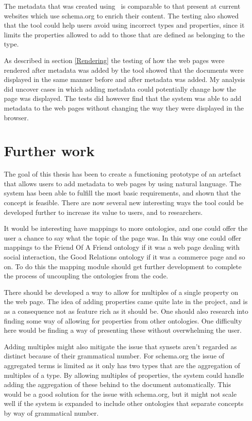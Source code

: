 The metadata that was created using \theartefact\ is comparable to that present at current websites which use schema.org to
enrich their content.
The testing also showed that the tool could help users avoid using incorrect types and properties,
since it limits the properties allowed to add to those that are defined as belonging to the type.

As described in section \ref{Rendering} the testing of how the web pages were rendered after metadata was added by the tool
showed that the documents were displayed in the same manner before and after metadata was added.
My analysis did uncover cases in which adding metadata could potentially change how the page was displayed.
The tests did however find that the system was able to add metadata to the web pages without changing the way they were displayed in the browser.


\section{Further work}
The goal of this thesis has been to create a functioning prototype of an artefact that allows users to add metadata
to web pages by using natural language.
The system has been able to fulfill the most basic requirements, and shown that the concept is feasible.
There are now several new interesting ways the tool could be developed further to increase its value to users,
and to researchers.

It would be interesting have mappings to more ontologies,
and one could offer the user a chance to say what the topic of the page was.
In this way one could offer mappings to the Friend Of A Friend ontology if it was a web page dealing with
social interaction, the Good Relations ontology if it was a commerce page and so on.
To do this the mapping module should get further development to complete the process of uncoupling the ontologies
from the code.

There should be developed a way to allow for multiples of a single property on the web page.
The idea of adding properties came quite late in the project,
and is as a consequence not as feature rich as it should be.
One should also research into finding some way of allowing for properties from other ontologies.
One difficulty here would be finding a way of presenting these without overwhelming the user.

Adding multiples might also mitigate the issue that synsets aren't regarded as distinct because of their grammatical number.
For schema.org the issue of aggregated terms is limited as it only has two types that are the aggregation of multiples of a type.
By allowing multiples of properties, the system could handle adding the aggregation of these behind to the document automatically.
This would be a good solution for the issue with schema.org,
but it might not scale well if the system is expanded to include other ontologies that separate concepts by way of grammatical number.


